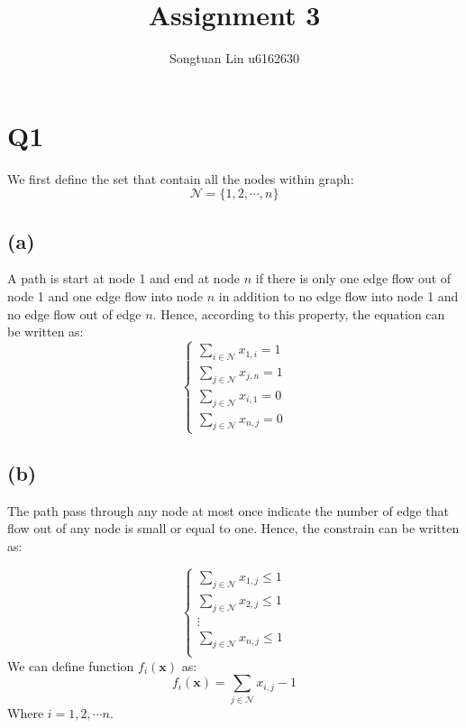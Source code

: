 \documentclass[10pt,a4paper]{article}
\author{Songtuan Lin u6162630}
\title{Assignment 3}
\begin{document}
\maketitle

\section*{Q1}
We first define the set that contain all the nodes within graph:
\begin{equation}
	\mathcal{N} = \{ 1, 2, \cdots, n \}
\end{equation}
\subsection*{(a)}
A path is start at node 1 and end at node $n$ if there is only one edge flow out of node 1 and one edge flow into node $n$ in addition to no edge flow into node 1 and no edge flow out of edge $n$. Hence, according to this property, the equation can be written as:
\begin{equation}
	\begin{cases}
		\displaystyle\sum_{i \in \mathcal{N}} x_{1, i} = 1 \\
		\displaystyle\sum_{j \in \mathcal{N}} x_{j, n} = 1 \\
		\displaystyle\sum_{j \in \mathcal{N}} x_{i, 1} = 0 \\
		\displaystyle\sum_{j \in \mathcal{N}} x_{n, j} = 0
	\end{cases}
	\label{1}
\end{equation}

\subsection*{(b)}
The path pass through any node at most once indicate the number of edge that flow out of any node is small or equal to one. Hence, the constrain can be written as:

\begin{equation}
	\begin{cases}
		\displaystyle\sum_{j \in \mathcal{N}} x_{1, j} \leq 1 \\
		\displaystyle\sum_{j \in \mathcal{N}} x_{2, j} \leq 1 \\
		\vdots \\
		\displaystyle\sum_{j \in \mathcal{N}} x_{n, j} \leq 1 \\
	\end{cases}
\end{equation}
We can define function $f_{i}(\mathbf{x})$ as:
\begin{equation}
	f_{i}(\mathbf{x}) = \displaystyle\sum_{j \in \mathcal{N}} x_{i, j} - 1
\end{equation}
Where $i = 1, 2, \cdots n$.
\end{document}

